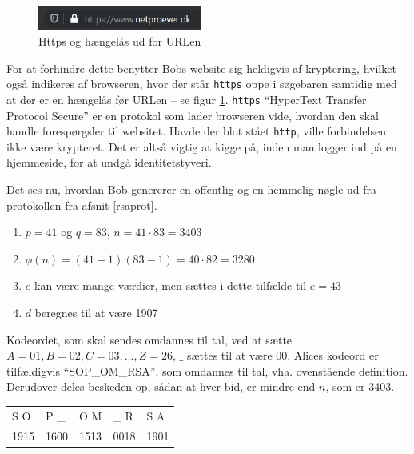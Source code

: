 \begin{figure}
    \vspace{-30pt}
    \begin{center}
        \includegraphics[width=0.48\textwidth]{img/secure.png}
    \end{center}
    \vspace{-20pt}
    \caption{Https og hængelås ud for URLen}
    \label{sikker}
    \vspace{-10pt}
\end{figure}

For at forhindre dette benytter Bobs website sig heldigvis af kryptering, hvilket også indikeres af browseren, hvor der står \texttt{https} oppe i søgebaren samtidig med at der er en hængelås før URLen -- se figur \ref{sikker}.
\texttt{https} ``HyperText Transfer Protocol Secure'' er en protokol som lader browseren vide, hvordan den skal handle forespørgsler til websitet. \cite{https} Havde der blot stået \texttt{http}, ville forbindelsen ikke være krypteret. Det er altså vigtig at kigge på, inden man logger ind på en hjemmeside, for at undgå identitetstyveri.
\par
Det ses nu, hvordan Bob genererer en offentlig og en hemmelig nøgle ud fra protokollen fra afsnit \ref{rsaprot}.

\begin{enumerate}[label*=(\arabic*)]%
    \item \(p = 41\) og \(q = 83\), \(n = 41 \cdot 83 = 3403\)
    \item \(\phi(n) = (41 - 1) (83 - 1) = 40 \cdot 82 = 3280\)
    \item \(e\) kan være mange værdier, men sættes i dette tilfælde til \(e = 43\)
    \item \(d\) beregnes til at være 1907
\end{enumerate}

Kodeordet, som skal sendes omdannes til tal, ved at sætte \(A=01, B=02, C=03, \hdots , Z=26\), \(\_\) sættes til at være 00.
Alices kodeord er tilfældigvis ``SOP\_OM\_RSA'', som omdannes til tal, vha. ovenstående definition.
Derudover deles beskeden op, sådan at hver bid, er mindre end \(n\), som er 3403.
\begin{center}
    \begin{tabular}{l l l l l}
        S O  & P \_  & O M  & \_ R  & S A\\
        1915 & 1600  & 1513  & 0018   & 1901\\
    \end{tabular}
\end{center}

